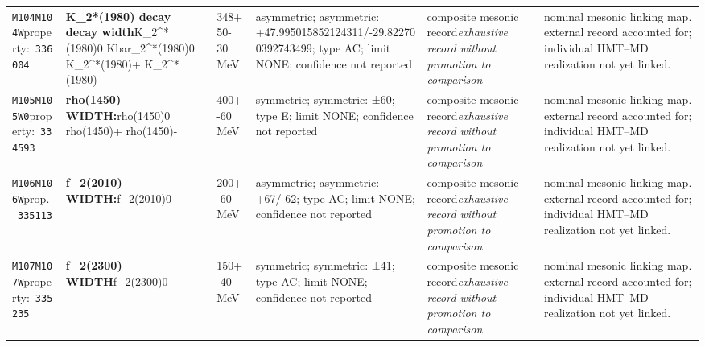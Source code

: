 \begin{landscape}
\begin{longtable}{L{1.85cm}L{4.45cm}L{2.35cm}L{4.05cm}L{3.35cm}L{7.15cm}}
\texttt{M104}\newline \texttt{M104W}\newline property:\ \texttt{336004} & \textbf{K\_\allowbreak{}2*(1980) decay decay width}\newline K\_\allowbreak{}2\textasciicircum{}*(1980)0 \textbar{}\allowbreak{} Kbar\_\allowbreak{}2\textasciicircum{}*(1980)0 \textbar{}\allowbreak{} K\_\allowbreak{}2\textasciicircum{}*(1980)+ \textbar{}\allowbreak{} K\_\allowbreak{}2\textasciicircum{}*(1980)- & 348+50-30\,MeV & asymmetric; asymmetric: +47.995015852124311/-29.822700392743499; type AC; limit NONE; confidence not reported & composite mesonic record\newline \emph{exhaustive record without promotion to comparison} & nominal mesonic linking map. external record accounted for; individual HMT--MD realization not yet linked. \\
\texttt{M105}\newline \texttt{M105W0}\newline property:\ \texttt{334593} & \textbf{rho(1450) WIDTH:}\newline rho(1450)0 \textbar{}\allowbreak{} rho(1450)+ \textbar{}\allowbreak{} rho(1450)- & 400+-60\,MeV & symmetric; symmetric: ±60; type E; limit NONE; confidence not reported & composite mesonic record\newline \emph{exhaustive record without promotion to comparison} & nominal mesonic linking map. external record accounted for; individual HMT--MD realization not yet linked. \\
\texttt{M106}\newline \texttt{M106W}\newline prop.\ \texttt{335113} & \textbf{f\_\allowbreak{}2(2010) WIDTH:}\newline f\_\allowbreak{}2(2010)0 & 200+-60\,MeV & asymmetric; asymmetric: +67/-62; type AC; limit NONE; confidence not reported & composite mesonic record\newline \emph{exhaustive record without promotion to comparison} & nominal mesonic linking map. external record accounted for; individual HMT--MD realization not yet linked. \\
\texttt{M107}\newline \texttt{M107W}\newline property:\ \texttt{335235} & \textbf{f\_\allowbreak{}2(2300) WIDTH}\newline f\_\allowbreak{}2(2300)0 & 150+-40\,MeV & symmetric; symmetric: ±41; type AC; limit NONE; confidence not reported & composite mesonic record\newline \emph{exhaustive record without promotion to comparison} & nominal mesonic linking map. external record accounted for; individual HMT--MD realization not yet linked. \\

\end{longtable}
\end{landscape}
